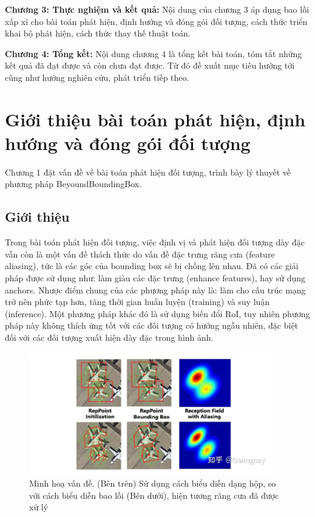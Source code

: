 \documentclass[12pt,a4paper,openany,oneside]{report}
\begin{document}
\textbf{Chương 3: Thực nghiệm và kết quả:}
Nội dung của chương 3 áp dụng bao lồi xấp xỉ cho bài toán phát hiện, định hướng và đóng gói đối tượng, cách thức triển khai bộ phát hiện, cách thức thay thế thuật toán.


\textbf{Chương 4: Tổng kết:}
Nội dung chương 4 là tổng kết bài toán, tóm tắt những kết quả đã đạt được và còn chưa đạt được. Từ đó đề xuất mục tiêu hướng tới cũng như hướng nghiên cứu, phát triển tiếp theo.


\chapter{Giới thiệu bài toán phát hiện, định hướng và đóng gói đối tượng}

Chương 1 đặt vấn đề về bài toán phát hiện đối tượng, trình bày lý thuyết về phương pháp BeyoundBoundingBox.



\section{Giới thiệu}
Trong bài toán phát hiện đối tượng, việc định vị và phát hiện đối tượng dày đặc vẫn còn là một vấn đề thách thức do vấn đề đặc trưng răng cưa (feature aliasing), tức là các góc của bounding box sẽ bị chồng lên nhau. Đã có các giải pháp được sử dụng như: làm giàu các đặc trưng (enhance features), hay sử dụng anchors. Nhược điểm chung của các phương pháp này là: làm cho cấu trúc mạng trở nên phức tạp hơn, tăng thời gian huấn luyện (training) và suy luận (inference). Một phương pháp khác đó là sử dụng biến đổi RoI, tuy nhiên phương pháp này không thích ứng tốt với các đối tượng có hướng ngẫu nhiên, đặc biệt đối với các đối tượng xuất hiện dày đặc trong hình ảnh.


\begin{figure}[ht!]
	\begin{center}
		\includegraphics[width=400px]{./compare_cfa_with_other.JPG}
		\caption{Minh hoạ vấn đề. (Bên trên) Sử dụng cách biểu diễn dạng hộp, so với cách biểu diễn bao lồi (Bên dưới), hiện tương răng cưa đã được xử lý}
		\label{fig_dhandang1}
	\end{center}
\end{figure} 
\end{document}
